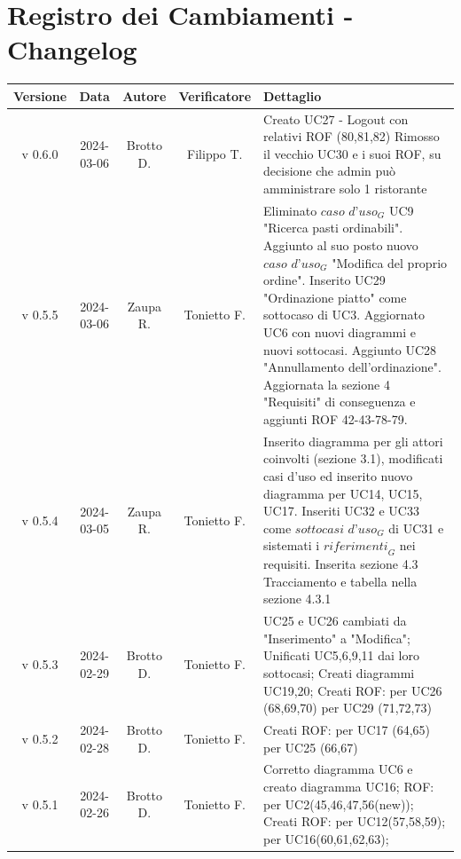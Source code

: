 \documentclass[12pt, oneside]{article}
\begin{document}
\section*{Registro dei Cambiamenti - Changelog}
\begin{longtable}{|c|c|c|c|p{7cm}|}
\hline
\textbf{Versione} & \textbf{Data} & \textbf{Autore} & \textbf{Verificatore} & 
\textbf{Dettaglio} \\
\hline
v 0.6.0 & 2024-03-06 & Brotto D. & Filippo T. & Creato UC27 - Logout con relativi ROF (80,81,82) 
\newline Rimosso il vecchio UC30 e i suoi ROF, su decisione che admin può amministrare solo 1 ristorante
\\
\hline
v 0.5.5 & 2024-03-06 & Zaupa R. & Tonietto F. & Eliminato $\textit{caso d'uso}_G$ UC9 "Ricerca pasti ordinabili". Aggiunto al suo posto nuovo $\textit{caso d'uso}_G$ "Modifica del proprio ordine". Inserito UC29 "Ordinazione piatto" come sottocaso di UC3. Aggiornato UC6 con nuovi diagrammi e nuovi sottocasi. Aggiunto UC28 "Annullamento dell'ordinazione". Aggiornata la sezione 4 "Requisiti" di conseguenza e aggiunti ROF 42-43-78-79. \\
\hline
v 0.5.4 & 2024-03-05 & Zaupa R. & Tonietto F. & Inserito diagramma per gli attori coinvolti (sezione 3.1), modificati casi d'uso ed inserito nuovo diagramma per UC14, UC15, UC17. Inseriti UC32 e UC33 come $\textit{sottocasi d'uso}_G$ di UC31 e sistemati i $\textit{riferimenti}_G$ nei requisiti. Inserita sezione 4.3 Tracciamento e tabella nella sezione 4.3.1\\
\hline
v 0.5.3 & 2024-02-29 & Brotto D. & Tonietto F. & UC25 e UC26 cambiati da "Inserimento" a "Modifica";
\newline Unificati UC5,6,9,11 dai loro sottocasi;
\newline Creati diagrammi UC19,20;
\newline Creati ROF:
\newline per UC26 (68,69,70)
\newline per UC29 (71,72,73)
\\
\hline
v 0.5.2 & 2024-02-28 & Brotto D. & Tonietto F. & Creati ROF:
\newline per UC17 (64,65) 
\newline per UC25 (66,67)
\\
\hline
v 0.5.1 & 2024-02-26 & Brotto D. & Tonietto F. & Corretto diagramma UC6 e creato diagramma UC16; \newline ROF: per UC2(45,46,47,56(new)); 
\newline Creati ROF: \newline per UC12(57,58,59); \newline per UC16(60,61,62,63); \\

\end{longtable}
\end{document}
